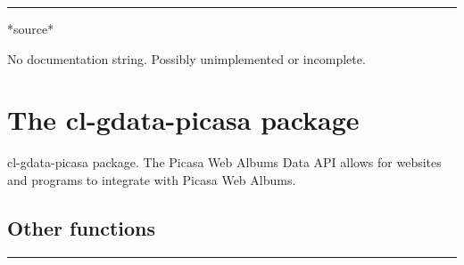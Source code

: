 \documentclass[a4paper]{report}
\begin{document}
  

    \rule{\linewidth}{0.1mm}
    
    \label{cl-gdata-service__variable___source_}
    \begin{defun}[Variable]
    *source*


	No documentation string.  Possibly unimplemented or incomplete.
	


    
    \end{defun}
  
  
    \chapter{The cl-gdata-picasa package}
    cl-gdata-picasa package.
The Picasa Web Albums Data API allows for websites and programs to integrate with Picasa Web Albums.
      \section{Other functions}
      

    \rule{\linewidth}{0.1mm}
    
\end{document}
